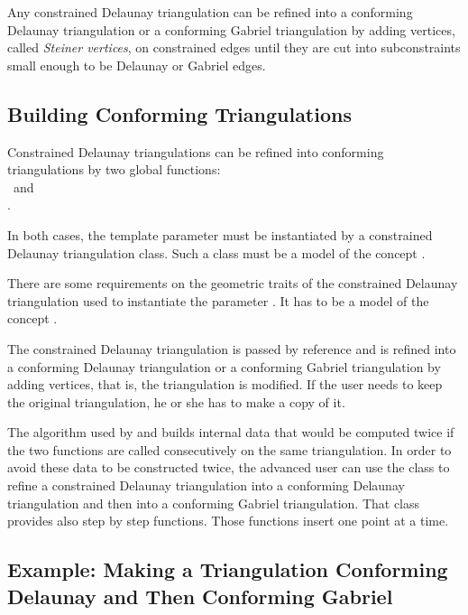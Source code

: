 Any constrained Delaunay triangulation can be refined into a
conforming Delaunay triangulation or a conforming Gabriel
triangulation by adding vertices, called \emph{Steiner vertices}, on
constrained edges until they are cut into subconstraints small enough
to be Delaunay or Gabriel edges.

\subsection{Building Conforming Triangulations}
\label{sec:Mesh_2_building_conforming}

Constrained Delaunay triangulations can be refined into
conforming triangulations 
by two global functions: \\
~and\\
. 

In both cases, the template parameter  must be instantiated
by a constrained Delaunay triangulation class.  Such a class must be a
model of the concept .

There are some requirements on the geometric traits of the constrained
Delaunay triangulation used to instantiate the parameter .
It has to be a model of the concept
.

The constrained Delaunay triangulation  is passed by reference
and is refined into a conforming Delaunay triangulation or a
conforming Gabriel triangulation by adding vertices, that is, the
triangulation is modified. If the user needs to keep the original
triangulation, he or she has to make a copy of it.

The algorithm used by  and
 builds internal data that would be
computed twice if the two functions are called consecutively on the same
triangulation. In order to avoid these data to be constructed twice, the
advanced user can use the class  to
refine a constrained Delaunay triangulation into a conforming Delaunay
triangulation and then into a conforming Gabriel triangulation. That class
provides also step by step functions. Those functions insert one point at a
time.

\subsection{Example: Making a Triangulation Conforming Delaunay and Then
  Conforming Gabriel}
\label{sec:Mesh_2_example_making_conforming}


